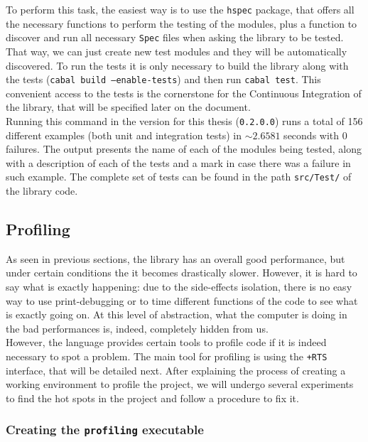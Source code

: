 To perform this task, the easiest way is to use the \texttt{hspec} package,
that offers all the necessary functions to perform the testing of the modules,
plus a function to discover and run all necessary \texttt{Spec} files when
asking the library to be tested. That way, we can just create new test modules
and they will be automatically discovered. To run the tests it is only
necessary to build the library along with the tests (\texttt{cabal build
  --enable-tests}) and then run \texttt{cabal test}. This convenient access to
the tests is the cornerstone for the Continuous Integration of the library,
that will be specified later on the document.\\

Running this command in the version for this thesis (\texttt{0.2.0.0}) runs a
total of 156 different examples (both unit and integration tests) in
$\sim 2.6581$ seconds with 0 failures. The output presents the name of each of
the modules being tested, along with a description of each of the tests and a
mark in case there was a failure in such example. The complete set of tests can
be found in the path \texttt{src/Test/} of the library code.\\


\subsection{Profiling}

As seen in previous sections, the library has an overall good performance, but
under certain conditions the it becomes drastically slower. However, it is hard
to say what is exactly happening: due to the side-effects isolation, there is
no easy way to use print-debugging or to time different functions of the code
to see what is exactly going on. At this level of abstraction, what the
computer is doing in the bad performances is, indeed, completely hidden from
us.\\

However, the language provides certain tools to profile code if it is indeed
necessary to spot a problem. The main tool for profiling is using the
\texttt{+RTS} interface, that will be detailed next. After explaining the
process of creating a working environment to profile the project, we will
undergo several experiments to find the hot spots in the project and follow a
procedure to fix it.\\

\subsubsection{Creating the \texttt{profiling} executable}

